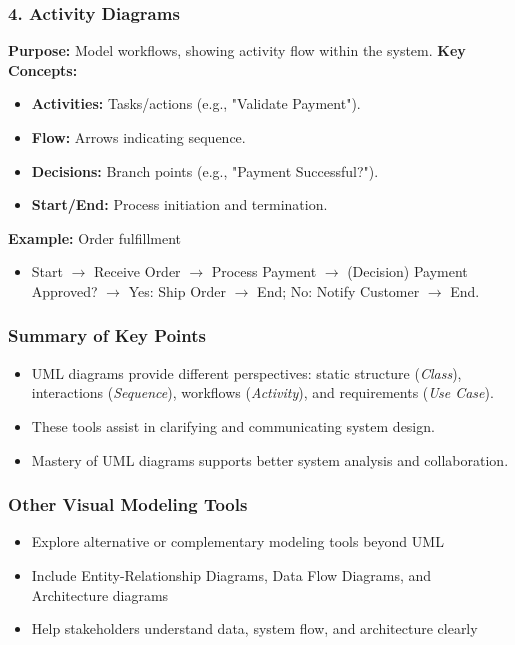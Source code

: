 \documentclass{beamer}
\begin{document}
\begin{frame}[fragile]
    \frametitle{4. Activity Diagrams}
    \textbf{Purpose:} Model workflows, showing activity flow within the system.
    \textbf{Key Concepts:}
    \begin{itemize}
        \item \textbf{Activities:} Tasks/actions (e.g., "Validate Payment").
        \item \textbf{Flow:} Arrows indicating sequence.
        \item \textbf{Decisions:} Branch points (e.g., "Payment Successful?").
        \item \textbf{Start/End:} Process initiation and termination.
    \end{itemize}
    \textbf{Example:} Order fulfillment
    \begin{itemize}
        \item Start \(\rightarrow\) Receive Order \(\rightarrow\) Process Payment \(\rightarrow\) (Decision) Payment Approved? \(\rightarrow\) Yes: Ship Order \(\rightarrow\) End; No: Notify Customer \(\rightarrow\) End.
    \end{itemize}
\end{frame}

\begin{frame}[fragile]
    \frametitle{Summary of Key Points}
    \begin{itemize}
        \item UML diagrams provide different perspectives: static structure (\textit{Class}), interactions (\textit{Sequence}), workflows (\textit{Activity}), and requirements (\textit{Use Case}).
        \item These tools assist in clarifying and communicating system design.
        \item Mastery of UML diagrams supports better system analysis and collaboration.
    \end{itemize}
\end{frame}

\begin{frame}[fragile]
    \frametitle{Other Visual Modeling Tools}
    \begin{itemize}
        \item Explore alternative or complementary modeling tools beyond UML
        \item Include Entity-Relationship Diagrams, Data Flow Diagrams, and Architecture diagrams
        \item Help stakeholders understand data, system flow, and architecture clearly
    \end{itemize}
\end{frame}
\end{document}
